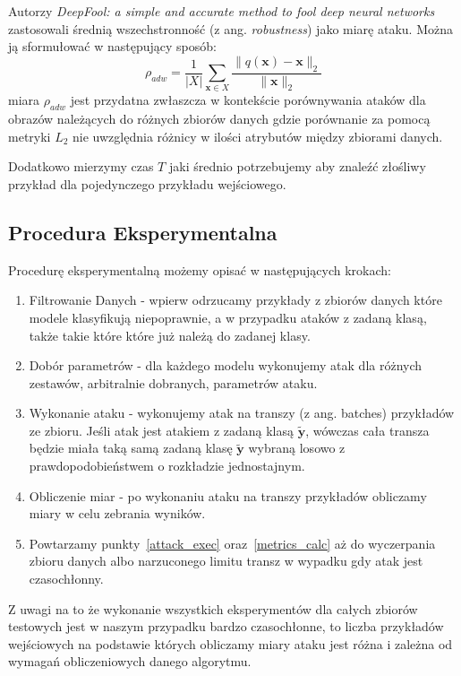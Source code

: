 \documentclass[
    left=2.5cm,         %
    right=2.5cm,        %
    top=2.5cm,          %
    bottom=3cm,         %
    bindingoffset=6mm,  %
    nohyphenation=false %
]{eiti/eiti-thesis}
\renewcommand{\vec}[1]{\mathbf{#1}}
\begin{document}
    Autorzy \textit{DeepFool: a simple and accurate method to fool deep neural networks}\cite{DBLP:journals/corr/Moosavi-Dezfooli15}
    zastosowali średnią wszechstronność (z ang. \textit{robustness}) jako miarę ataku. Można ją sformułować w następujący sposób:
    \begin{equation}
        \rho_{adw}=\frac{1}{|X|}\sum_{\vec{x} \in X} \frac{\|q(\vec{x}) - \vec{x}\|_2}{\|\vec{x}\|_2}
    \end{equation}
    miara \(\rho_{adw}\) jest przydatna zwłaszcza w kontekście porównywania ataków dla obrazów należących do
    różnych zbiorów danych gdzie porównanie za pomocą metryki \(L_2\) nie uwzględnia różnicy w ilości atrybutów między zbiorami
    danych.

    Dodatkowo mierzymy czas $T$ jaki średnio potrzebujemy aby znaleźć złośliwy przykład dla pojedynczego przykładu wejściowego.
\subsection{Procedura Eksperymentalna}
Procedurę eksperymentalną możemy opisać w następujących krokach:
\begin{enumerate}
    \item Filtrowanie Danych - wpierw odrzucamy przykłady z zbiorów danych które modele klasyfikują niepoprawnie, a w
    przypadku ataków z zadaną klasą, także takie które które już należą do zadanej klasy.
    \item Dobór parametrów  - dla każdego modelu wykonujemy atak dla różnych zestawów, arbitralnie dobranych, parametrów ataku.
    \item Wykonanie ataku \label{attack_exec} - wykonujemy atak na transzy (z ang. batches) przykładów ze zbioru. Jeśli atak jest atakiem z zadaną klasą $\vec{\widetilde{y}}$, wówczas
    cała transza będzie miała taką samą zadaną klasę $\vec{\widetilde{y}}$ wybraną losowo z prawdopodobieństwem o rozkładzie jednostajnym.
    \item Obliczenie miar \label{metrics_calc} - po wykonaniu ataku na transzy przykładów obliczamy miary w celu zebrania wyników.
    \item Powtarzamy punkty~\ref{attack_exec} oraz~\ref{metrics_calc} aż do wyczerpania zbioru danych albo narzuconego limitu transz w wypadku gdy atak jest czasochłonny.
\end{enumerate}
Z uwagi na to że wykonanie wszystkich eksperymentów dla całych zbiorów testowych jest w naszym przypadku bardzo czasochłonne,
to liczba przykładów wejściowych na podstawie których obliczamy miary ataku jest różna i zależna od wymagań obliczeniowych
danego algorytmu.
\end{document}
